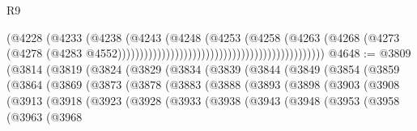 \begin{lexlean}{R9}
\begin{coremodule}
{{{{{{{{{{{{{{{{{{{{{{{{{{{{{{{{{{{{{{{{{{{{{{{{{{{{{{{{{{{{{{{{{{{{{{{{{{{{{{{{{{{{                                                                          (@4228
                                                                            (@4233
                                                                              (@4238
                                                                                (@4243
                                                                                  (@4248
                                                                                    (@4253
                                                                                      (@4258
                                                                                        (@4263
                                                                                          (@4268
                                                                                            (@4273
                                                                                              (@4278
                                                                                                (@4283
                                                                                                  @4552)))))))))))))))))))))))))))))))))))))))))))))))
@4648 := @3809
    (@3814
      (@3819
        (@3824
          (@3829
            (@3834
              (@3839
                (@3844
                  (@3849
                    (@3854
                      (@3859
                        (@3864
                          (@3869
                            (@3873
                              (@3878
                                (@3883
                                  (@3888
                                    (@3893
                                      (@3898
                                        (@3903
                                          (@3908
                                            (@3913
                                              (@3918
                                                (@3923
                                                  (@3928
                                                    (@3933
                                                      (@3938
                                                        (@3943
                                                          (@3948
                                                            (@3953
                                                              (@3958
                                                                (@3963
                                                                  (@3968
}}}}}}}}}}}}}}}}}}}}}}}}}}}}}}}}}}}}}}}}}}}}}}}}}}}}}}}}}}}}}}}}}}}}}}}}}}}}}}}}}}}}
\end{coremodule}
\end{lexlean}
